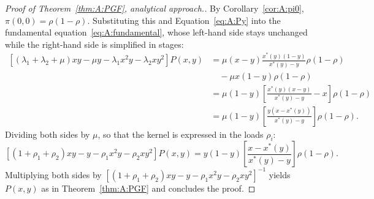 \begin{proof}[Proof of Theorem~\ref{thm:A:PGF}, analytical approach.]
    By Corollary~\ref{cor:A:pi0}, $\pi(0,0)=\rho(1-\rho)$. Substituting this and
    Equation~\eqref{eq:A:Py} into the fundamental equation~\eqref{eq:A:fundamental}, whose
    left-hand side stays unchanged while the right-hand side is simplified in stages:
    \begin{align*}
            \left[ (\lambda_1+\lambda_2+ \mu)xy - \mu y - \lambda_1 x^2y - \lambda_2 xy^2 \right] P(x,y)
            &= \mu(x-y) \frac{x^*(y)(1-y)}{x^*(y) - y} \rho(1-\rho) \\
            &\quad - \mu x(1-y) \rho(1-\rho) \\
            &= \mu (1-y) \left[ \frac{x^*(y)(x-y)}{x^*(y)-y} - x \right] \rho (1-\rho) \\
            &= \mu  (1-y) \left[ \frac{y(x - x^*(y))}{x^*(y) - y} \right] \rho (1-\rho).
    \end{align*}
    Dividing both sides by $\mu$, so that the kernel is expressed in the loads $\rho_i$:
    \begin{equation*}
            \left[ (1 + \rho_1 + \rho_2)xy - y-\rho_1 x^2y - \rho_2 xy^2 \right] P(x,y)
            = y (1-y) \left[ \frac{x - x^*(y)}{x^*(y) - y} \right] \rho (1-\rho).
    \end{equation*}
    Multiplying both sides by $\left[(1 + \rho_1 + \rho_2)xy - y-\rho_1 x^2y - \rho_2 xy^2\right]^{-1}$
    yields $P(x,y)$ as in Theorem~\ref{thm:A:PGF} and concludes the proof.
\end{proof}


